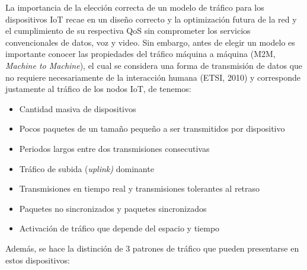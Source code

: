 La importancia de la elección correcta de un modelo de tráfico para los dispositivos IoT recae en un diseño correcto y la optimización futura de la red y el cumplimiento de su respectiva QoS sin comprometer los servicios convencionales de datos, voz y video. Sin embargo, antes de elegir un modelo es importante conocer las propiedades del tráfico máquina a máquina (M2M, \textit{Machine to Machine}), el cual se considera una forma de transmisión de datos que no requiere necesariamente de la interacción humana (ETSI, 2010) y corresponde justamente al tráfico de los nodos IoT, de \parencite{Laner2013} tenemos:

\begin{itemize}
\item  Cantidad masiva de dispositivos
\item  Pocos paquetes de un tamaño pequeño a ser transmitidos por dispositivo
\item  Periodos largos entre dos transmisiones consecutivas
\item  Tráfico de subida (\textit{uplink)} dominante
\item  Transmisiones en tiempo real y transmisiones tolerantes al retraso
\item  Paquetes no sincronizados y paquetes sincronizados
\item  Activación de tráfico que depende del espacio y tiempo
\end{itemize}

Además, se hace  la distinción de 3 patrones de tráfico que pueden presentarse en estos dispositivos:

